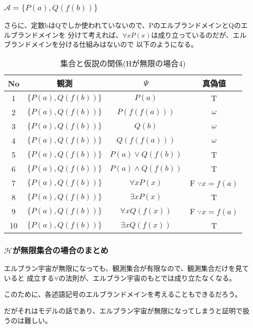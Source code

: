 \documentclass[10pt, oneside]{jarticle}   	%
\theoremstyle{definition}
\newcommand{\undet}{\omega}
\newcommand{\eset}[1]{\{{#1}\}}
\begin{document}
\subsubsection{$\mathcal{A}=\eset{P(a), Q(f(b))}$}
さらに、定数bはQでしか使われていないので、PのエルブランドメインとQのエルブランドメインを
分けて考えれば、$\forall x P(x)$は成り立っているのだが、エルブランドメインを分ける仕組みはないので
以下のようになる。

\begin{table}[htbp]
 \centering
 \begin{tabular}{|c|c|c|c|}\hline
   No & 観測 & $\Psi$ & 真偽値 \\ \hline
   1 & $\eset{P(a), Q(f(b))}$ & $P(a)$ & T \\ \hline
   2 & $\eset{P(a), Q(f(b))}$ & $P(f(f(a)))$ & $\undet$ \\ \hline
   3 & $\eset{P(a), Q(f(b))}$ & $Q(b)$ & $\undet$ \\ \hline
   4 & $\eset{P(a), Q(f(b))}$ & $Q(f(f(a)))$ & $\undet$ \\ \hline
   
   5 & $\eset{P(a), Q(f(b))}$ & $P(a) \lor Q(f(b))$ & T \\ \hline
   6 & $\eset{P(a), Q(f(b))}$ & $P(a) \land Q(f(b))$ & T\\ \hline
   
   7 & $\eset{P(a), Q(f(b))}$ & $\forall x P(x)$ & F $\because x=f(a)$ \\ \hline
   8 & $\eset{P(a), Q(f(b))}$ & $\exists x P(x)$ & T \\ \hline
   9 & $\eset{P(a), Q(f(b))}$ & $\forall x Q(f(x))$ & F $\because x=f(a)$\\ \hline
   10 & $\eset{P(a), Q(f(b))}$ & $\exists x Q(f(x))$ & T \\ \hline
 \end{tabular}
 \caption{集合と仮説の関係(Hが無限の場合4)}
 \label{tab:ex0204}
\end{table}

\subsubsection{$\mathcal{H}$が無限集合の場合のまとめ}
エルブラン宇宙が無限になっても、観測集合が有限なので、観測集合だけを見ていると
成立する$\forall$の法則が、エルブラン宇宙のもとでは成り立たなくなる。

このために、各述語記号のエルブランドメインを考えることもできるだろう。

だがそれはモデルの話であり、エルブラン宇宙が無限になってしまうと証明で扱うのは難しい。
\end{document}
